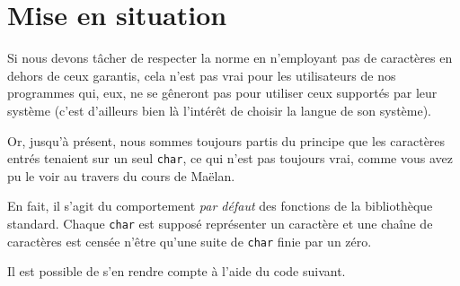 \documentclass[]{article}
\date{}
\newenvironment{Shaded}{}{}
\newcommand{\KeywordTok}[1]{\textcolor[rgb]{0.00,0.44,0.13}{\textbf{{#1}}}}
\newcommand{\DataTypeTok}[1]{\textcolor[rgb]{0.56,0.13,0.00}{{#1}}}
\newcommand{\DecValTok}[1]{\textcolor[rgb]{0.25,0.63,0.44}{{#1}}}
\newcommand{\CharTok}[1]{\textcolor[rgb]{0.25,0.44,0.63}{{#1}}}
\newcommand{\SpecialCharTok}[1]{\textcolor[rgb]{0.25,0.44,0.63}{{#1}}}
\newcommand{\StringTok}[1]{\textcolor[rgb]{0.25,0.44,0.63}{{#1}}}
\newcommand{\ImportTok}[1]{{#1}}
\newcommand{\ControlFlowTok}[1]{\textcolor[rgb]{0.00,0.44,0.13}{\textbf{{#1}}}}
\newcommand{\PreprocessorTok}[1]{\textcolor[rgb]{0.74,0.48,0.00}{{#1}}}
\newcommand{\NormalTok}[1]{{#1}}
\begin{document}
{
\setcounter{tocdepth}{3}
\tableofcontents
}
\section{Mise en situation}\label{mise-en-situation}

Si nous devons tâcher de respecter la norme en n'employant pas de
caractères en dehors de ceux garantis, cela n'est pas vrai pour les
utilisateurs de nos programmes qui, eux, ne se gêneront pas pour
utiliser ceux supportés par leur système (c'est d'ailleurs bien là
l'intérêt de choisir la langue de son système).

Or, jusqu'à présent, nous sommes toujours partis du principe que les
caractères entrés tenaient sur un seul \texttt{char}, ce qui n'est pas
toujours vrai, comme vous avez pu le voir au travers du cours de Maëlan.

En fait, il s'agit du comportement \emph{par défaut} des fonctions de la
bibliothèque standard. Chaque \texttt{char} est supposé représenter un
caractère et une chaîne de caractères est censée n'être qu'une suite de
\texttt{char} finie par un zéro.

Il est possible de s'en rendre compte à l'aide du code suivant.

\begin{Shaded}
\end{Shaded}
\end{document}
